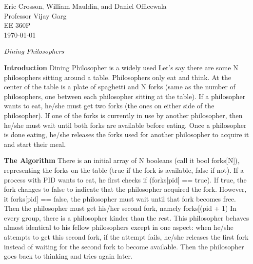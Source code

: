 \documentclass[12pt]{article}
\begin{document}
\begin{flushleft}
Eric Crosson, William Mauldin, and Daniel Officewala \\
Professor Vijay Garg\\
EE 360P \\
\today \\

\begin{center}
\emph{Dining Philosophers}
\end{center}

\setlength{\parindent}{0.5in}

\textbf{Introduction}
\newline
Dining Philosopher is a widely used Let’s say there are some N philosophers sitting around a table. Philosophers only eat and think. At the center of the table is a plate of spaghetti and N forks (same as the number of philosophers, one between each philosopher sitting at the table). If a philosopher wants to eat, he/she must get two forks (the ones on either side of the philosopher). If one of the forks is currently in use by another philosopher, then he/she must wait until both forks are available before eating. Once a philosopher is done eating, he/she releases the forks used for another philosopher to acquire it and start their meal.

\textbf{The Algorithm}
\newline
There is an initial array of N booleans (call it bool forks[N]), representing the forks on the table (true if the fork is available, false if not). If a process with PID wants to eat, he first checks if (forks[pid] == true). If true, the fork changes to false to indicate that the philosopher acquired the fork. However, it forks[pid] ==  false, the philosopher must wait until that fork becomes free. Then the philosopher must get his/her second fork, namely forks[(pid + 1) %
In every group, there is a philosopher kinder than the rest. This philosopher behaves almost identical to his fellow philosophers except in one aspect: when he/she attempts to get this second fork, if the attempt fails, he/she releases the first fork instead of waiting for the second fork to become available. Then the philosopher goes back to thinking and tries again later.


\end{flushleft}
\end{document}
